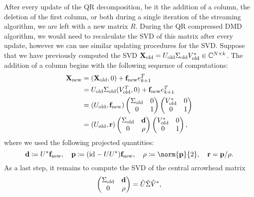 After every update of the QR decomposition, be it the addition of a column, the deletion of the first column, or both during a single iteration of the streaming algorithm, we are left with a new matrix $R$. During the QR compressed DMD algorithm, we would need to recalculate the SVD of this matrix after every update, however we can use similar updating procedures for the SVD. Suppose that we have previously computed the SVD $\mathbf{X}_\text{old} = U_\text{old} \Sigma_\text{old} V_\text{old}^* \in \mathbb{C}^{N \times k}$. The addition of a column begins with the following sequence of computations:
\begin{align*}
    \mathbf{X}_\text{new} &= (\mathbf{X}_\text{old}, 0) + \mathbf{f}_\text{new} e_{k + 1}^T \\
     &= U_\text{old} \Sigma_\text{old} (V_\text{old}^T, 0) + \mathbf{f}_\text{new} e_{k + 1}^T \\
     &= (U_\text{old}, \mathbf{f}_\text{new}) \begin{pmatrix}
        \Sigma_\text{old} & 0 \\
        0 & 1 \\
     \end{pmatrix} \begin{pmatrix}
        V_\text{old}^* & 0 \\
        0 & 1
     \end{pmatrix} \\
     &= (U_\text{old}, \mathbf{r}) \begin{pmatrix}
        \Sigma_\text{old} & \mathbf{d} \\
        0 & \rho \\
     \end{pmatrix} \begin{pmatrix}
        V_\text{old}^* & 0 \\
        0 & 1
     \end{pmatrix},
\end{align*}
where we used the following projected quantities:
\begin{equation*}
    \bl{d} \coloneqq U^* \bl{f}_\text{new},\quad \bl{p} \coloneqq (\id{} - U U^*) \bl{f}_\text{new},\quad \rho \coloneqq \norm{\bl{p}}{2},\quad \bl{r} = \bl{p} / \rho.
\end{equation*}
As a last step, it remains to compute the SVD of the central arrowhead matrix
\begin{equation*}
    \begin{pmatrix}
        \Sigma_\text{old} & \mathbf{d} \\
        0 & \rho \\
     \end{pmatrix} = \tilde{U} \tilde{\Sigma} \tilde{V}^*,
\end{equation*}
